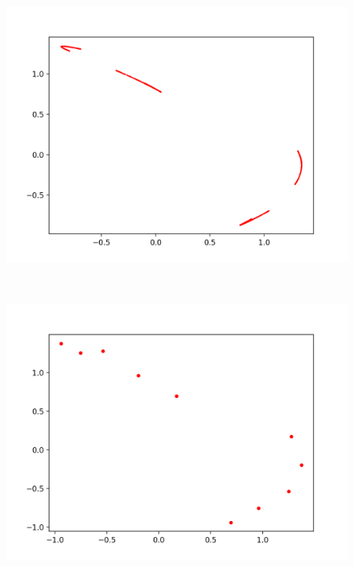\documentclass[12pt]{article}
\theoremstyle{plain}
\begin{document}
\begin{figure}[H]
\begin{minipage}[c][0.32\width]{0.32\textwidth}
\end{minipage}
\begin{minipage}[c][0.32\width]{0.32\textwidth}
   \centering
   \includegraphics[width=\textwidth]{figure/section2/Henon-attractor-1*0-0*4.png}
\end{minipage}
\\[12ex]
\begin{minipage}[c][0.32\width]{0.32\textwidth}
   \centering
   \includegraphics[width=\textwidth]{figure/section2/Henon-attractor-1*0293-0*4.png}
\end{minipage}
\begin{minipage}[c][0.32\width]{0.32\textwidth}
   \centering

\end{minipage}
\end{figure}
\end{document}
